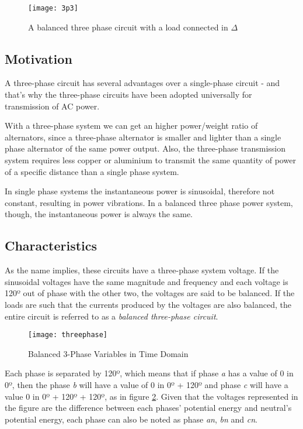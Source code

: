 \begin{figure}[htbp]
	\centering
	\texttt{[image: 3p3]}
	\caption{A balanced three phase circuit with a load connected in $\Delta$}
	\label{fig:balanced_tp_circuit}
\end{figure}

\subsection{Motivation}

A three-phase circuit has several advantages over a single-phase circuit - and that's why the three-phase circuits have been adopted universally for transmission of AC power.

With a three-phase system we can get an higher power/weight ratio of alternators, since a three-phase alternator is smaller and lighter than a single phase alternator of the same power output. Also, the three-phase transmission system  requires less copper or aluminium to transmit the same quantity of power of a specific distance than a single phase system.

In single phase systems the instantaneous power is sinusoidal, therefore not constant, resulting in power vibrations. In a balanced three phase power system, though, the instantaneous power is always the same.

\subsection{Characteristics}

As the name implies, these circuits have a three-phase system voltage. If the sinusoidal voltages have the same magnitude and frequency and each voltage is 120º out of phase with the other two, the voltages are said to be balanced. If the loads are such that the currents produced by the voltages are also balanced, the entire circuit is referred to as a \emph{balanced three-phase circuit}.

\begin{figure}[htbp]
	\centering
	\texttt{[image: threephase]}
	\caption{Balanced 3-Phase Variables in Time Domain}
	\label{fig:balanced_tp_time_domain}
\end{figure}

Each phase is separated by 120º, which means that if phase \emph{a} has a value of 0 in 0º, then the phase \emph{b} will have a value of 0 in 0º + 120º and phase \emph{c} will have a value 0 in 0º + 120º + 120º, as in figure \ref{fig:balanced_tp_time_domain}. Given that the voltages represented in the figure are the difference between each phases' potential energy and neutral's potential energy, each phase can also be noted as phase \emph{an}, \emph{bn} and \emph{cn}.

